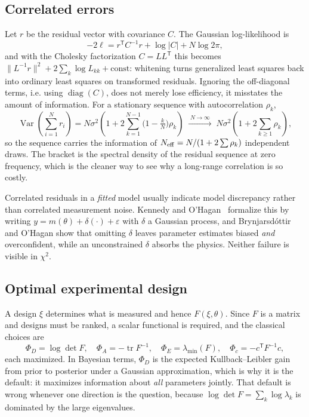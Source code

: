 \documentclass[10pt]{article}
\begin{document}
\subsection{Correlated errors}

Let $r$ be the residual vector with covariance $C$. The Gaussian log-likelihood is
%
\begin{equation}
-2\ell = r^{\mathsf T}C^{-1}r + \log|C| + N\log 2\pi ,
\end{equation}
%
and with the Cholesky factorization $C = LL^{\mathsf T}$ this becomes
$\|L^{-1}r\|^2 + 2\sum_k\log L_{kk} + \text{const}$: whitening turns generalized least
squares back into ordinary least squares on transformed residuals. Ignoring the off-diagonal
terms, i.e. using $\operatorname{diag}(C)$, does not merely lose efficiency, it
misstates the amount of information. For a stationary sequence with autocorrelation
$\rho_k$,
%
\begin{equation}
\operatorname{Var}\!\left(\sum_{i=1}^N r_i\right)
= N\sigma^2\left(1 + 2\sum_{k=1}^{N-1}\Big(1 - \tfrac{k}{N}\Big)\rho_k\right)
\;\xrightarrow{\;N\to\infty\;}\; N\sigma^2\left(1 + 2\sum_{k\ge1}\rho_k\right),
\end{equation}
%
so the sequence carries the information of $N_{\rm eff} = N/(1 + 2\sum\rho_k)$ independent
draws. The bracket is the spectral density of the residual sequence at zero frequency, which
is the cleaner way to see why a long-range correlation is so costly.

Correlated residuals in a \emph{fitted} model usually indicate model discrepancy rather than
correlated measurement noise. Kennedy and O'Hagan~\citep{kennedy2001bayesian} formalize this by writing
$y = m(\theta) + \delta(\cdot) + \varepsilon$ with $\delta$ a Gaussian process, and
Brynjarsd\'ottir and O'Hagan show that omitting $\delta$ leaves parameter estimates biased
\emph{and} overconfident, while an unconstrained $\delta$ absorbs the physics. Neither
failure is visible in $\chi^2$.

\subsection{Optimal experimental design}

A design $\xi$ determines what is measured and hence $F(\xi,\theta)$. Since $F$ is a matrix
and designs must be ranked, a scalar functional is required, and the classical choices are
%
\begin{equation}
\Phi_D = \log\det F, \quad
\Phi_A = -\operatorname{tr}F^{-1}, \quad
\Phi_E = \lambda_{\min}(F), \quad
\Phi_c = -c^{\mathsf T}F^{-1}c ,
\end{equation}
%
each maximized. In Bayesian terms, $\Phi_D$ is the expected Kullback--Leibler gain from
prior to posterior under a Gaussian approximation, which is why it is the default: it
maximizes information about \emph{all} parameters jointly. That default is wrong whenever
one direction is the question, because $\log\det F = \sum_k\log\lambda_k$ is dominated by
the large eigenvalues.
\end{document}
